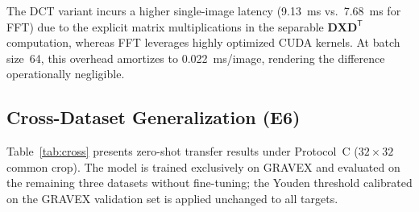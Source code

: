 \documentclass[conference]{IEEEtran}
\begin{document}
\begin{table}[t]
\caption{Computational Efficiency Comparison}
\label{tab:efficiency}
\centering
{}
\end{table}

The DCT variant incurs a higher single-image latency (9.13~ms vs.\ 7.68~ms for FFT) due to the explicit matrix multiplications in the separable $\mathbf{D}\mathbf{X}\mathbf{D}^\mathsf{T}$ computation, whereas FFT leverages highly optimized CUDA kernels. At batch size~64, this overhead amortizes to 0.022~ms/image, rendering the difference operationally negligible.

\subsection{Cross-Dataset Generalization (E6)}

Table~\ref{tab:cross} presents zero-shot transfer results under Protocol~C ($32{\times}32$ common crop). The model is trained exclusively on GRAVEX and evaluated on the remaining three datasets without fine-tuning; the Youden threshold calibrated on the GRAVEX validation set is applied unchanged to all targets.

\begin{table}[t]
\caption{Zero-Shot Cross-Dataset Transfer (Protocol~C, $32{\times}32$)}
\label{tab:cross}
\centering
{}
\end{table}
\end{document}
